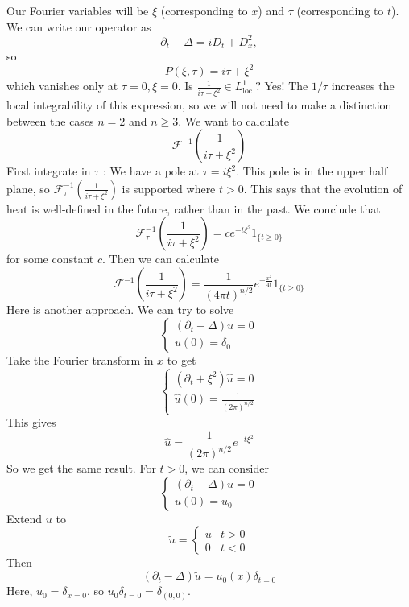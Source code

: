 Our Fourier variables will be $\xi$ (corresponding to $x$) and $\tau$ (corresponding to $t$). We can write our operator as
$$
\partial_{t}-\Delta=i D_{t}+D_{x}^{2},
$$
so
$$
P(\xi, \tau)=i \tau+\xi^{2}
$$
which vanishes only at $\tau=0, \xi=0 .$ Is $\frac{1}{i \tau+\xi^{2}} \in L_{\text {loc }}^{1} ?$ Yes! The $1 / \tau$ increases the local integrability of this expression, so we will not need to make a distinction between the cases $n=2$ and $n \geq 3$. We want to calculate
\[
    \mathcal{F}^{-1}\left(\frac{1}{i \tau+\xi^{2}}\right)
\]
First integrate in $\tau$ : We have a pole at $\tau=i \xi^{2}$. This pole is in the upper half plane, so $\mathcal{F}_{\tau}^{-1}\left(\frac{1}{i \tau+\xi^{2}}\right)$ is supported where $t>0$. This says that the evolution of heat is well-defined in the future, rather than in the past. We conclude that
$$
\mathcal{F}_{\tau}^{-1}\left(\frac{1}{i \tau+\xi^{2}}\right)=c e^{-t \xi^{2}} 1_{\{t \geq 0\}}
$$
for some constant $c$. Then we can calculate
$$
\mathcal{F}^{-1}\left(\frac{1}{i \tau+\xi^{2}}\right)=\frac{1}{(4 \pi t)^{n / 2}} e^{-\frac{x^{2}}{4 t}} 1_{\{t \geq 0\}}
$$
Here is another approach. We can try to solve
$$
\left\{\begin{array}{l}
\left(\partial_{t}-\Delta\right) u=0 \\
u(0)=\delta_{0}
\end{array}\right.
$$
Take the Fourier transform in $x$ to get
$$
\left\{\begin{array}{l}
\left(\partial_{t}+\xi^{2}\right) \widehat{u}=0 \\
\widehat{u}(0)=\frac{1}{(2 \pi)^{n / 2}}
\end{array}\right.
$$
This gives
$$
\widehat{u}=\frac{1}{(2 \pi)^{n / 2}} e^{-t \xi^{2}}
$$
So we get the same result.
For $t>0$, we can consider
$$
\left\{\begin{array}{l}
\left(\partial_{t}-\Delta\right) u=0 \\
u(0)=u_{0}
\end{array}\right.
$$
Extend $u$ to
$$
\widetilde{u}= \begin{cases}u & t>0 \\ 0 & t<0\end{cases}
$$
Then
$$
\left(\partial_{t}-\Delta\right) \widetilde{u}=u_{0}(x) \delta_{t=0}
$$
Here, $u_{0}=\delta_{x=0}$, so $u_{0} \delta_{t=0}=\delta_{(0,0)}$.